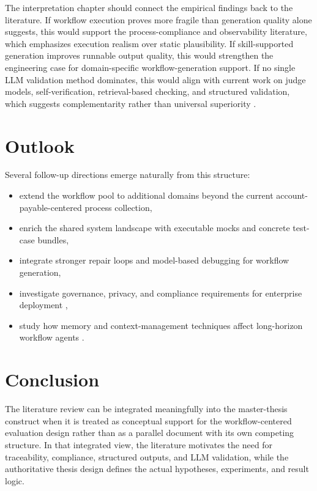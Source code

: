 \documentclass[12pt,a4paper]{article}
\begin{document}
The interpretation chapter should connect the empirical findings back to the literature. If workflow execution proves more fragile than generation quality alone suggests, this would support the process-compliance and observability literature, which emphasizes execution realism over static plausibility. If skill-supported generation improves runnable output quality, this would strengthen the engineering case for domain-specific workflow-generation support. If no single LLM validation method dominates, this would align with current work on judge models, self-verification, retrieval-based checking, and structured validation, which suggests complementarity rather than universal superiority \cite{lightman2023verify,dhuliawala2024cove,liu2023geval,geng2025jsonschemabench}.

\section{Outlook}

Several follow-up directions emerge naturally from this structure:

\begin{itemize}[leftmargin=*]
  \item extend the workflow pool to additional domains beyond the current account-payable-centered process collection,
  \item enrich the shared system landscape with executable mocks and concrete test-case bundles,
  \item integrate stronger repair loops and model-based debugging for workflow generation,
  \item investigate governance, privacy, and compliance requirements for enterprise deployment \cite{gdpr2016,carlini2021extracting,dwork2014afdp},
  \item study how memory and context-management techniques affect long-horizon workflow agents \cite{packer2023memgpt,xu2025amem_agentic_memory,hu2025memoryagentbench}.
\end{itemize}

\section{Conclusion}

The literature review can be integrated meaningfully into the master-thesis construct when it is treated as conceptual support for the workflow-centered evaluation design rather than as a parallel document with its own competing structure. In that integrated view, the literature motivates the need for traceability, compliance, structured outputs, and LLM validation, while the authoritative thesis design defines the actual hypotheses, experiments, and result logic.

\printbibliography
\end{document}
